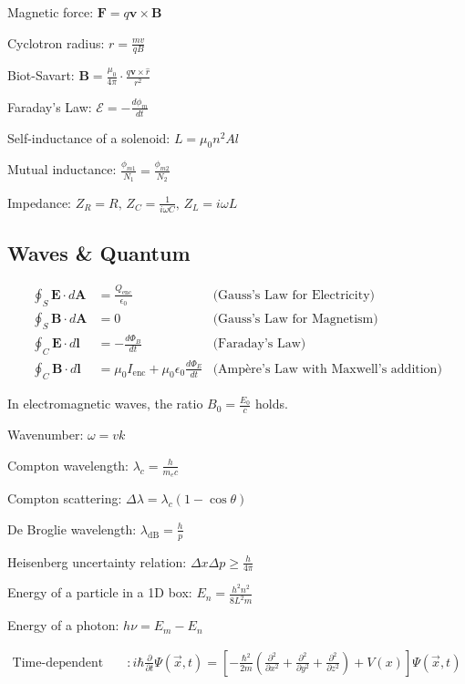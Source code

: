 \documentclass[12pt,a4paper]{article}
\begin{document}
	
	Magnetic force: \( \mathbf{F} = q\mathbf{v} \times \mathbf{B} \)
	
	Cyclotron radius: \( r = \frac{mv}{qB} \)
	
	Biot-Savart: \( \mathbf{B} = \frac{\mu_0}{4 \pi} \cdot \frac{q \mathbf{v} \times \hat{r}}{r^2} \)
	
	Faraday's Law: \( \mathcal{E} = -\frac{d \phi_m}{dt} \)
	
	Self-inductance of a solenoid: \( L = \mu_0 n^2 A l \)
	
	Mutual inductance: \( \frac{\phi_{m1}}{N_1} = \frac{\phi_{m2}}{N_2} \)
	
	Impedance: \( Z_R = R, \, Z_C = \frac{1}{i \omega C}, \, Z_L = i \omega L \)
	
	
	\subsection*{Waves \& Quantum}
	\begin{align}
		\oint_{S} \mathbf{E} \cdot d\mathbf{A} &= \frac{Q_{\text{enc}}}{\epsilon_0} &\text{(Gauss's Law for Electricity)} \\
		\oint_{S} \mathbf{B} \cdot d\mathbf{A} &= 0 &\text{(Gauss's Law for Magnetism)} \\
		\oint_{C} \mathbf{E} \cdot d\mathbf{l} &= -\frac{d\Phi_{B}}{dt} &\text{(Faraday's Law)} \\
		\oint_{C} \mathbf{B} \cdot d\mathbf{l} &= \mu_0 I_{\text{enc}} + \mu_0 \epsilon_0 \frac{d\Phi_{E}}{dt} &\text{(Ampère's Law with Maxwell's addition)}
	\end{align}
	
	In electromagnetic waves, the ratio \( B_0 = \frac{E_0}{c} \) holds.
	
	Wavenumber: \( \omega = vk \)
	
	Compton wavelength: \( \lambda_c = \frac{h}{m_e c} \)
	
	Compton scattering: \( \Delta \lambda = \lambda_c (1-\cos \theta )\)
	
	De Broglie wavelength: \( \lambda_{\text{dB}} = \frac{h}{p} \)
	
	Heisenberg uncertainty relation: \( \Delta x \Delta p \geq \frac{h}{4\pi} \)
	
	Energy of a particle in a 1D box: \( E_n = \frac{h^2 n^2}{8L^2m} \)
	
	Energy of a photon: \( h \nu = E_m - E_n\)

	\begin{align*}
		\text{Time-dependent Schrodinger's Equation} & : i\hbar \frac{\partial}{\partial t} \Psi (\vec{x}, t) = [-\frac{\hbar^2}{2m}(\frac{\partial ^2}{\partial x^2} + \frac{\partial ^2}{\partial y ^2} + \frac{\partial^2}{\partial z^2}) + V(x)]\Psi (\vec{x}, t) \\
	\end{align*}
	
\end{document}
